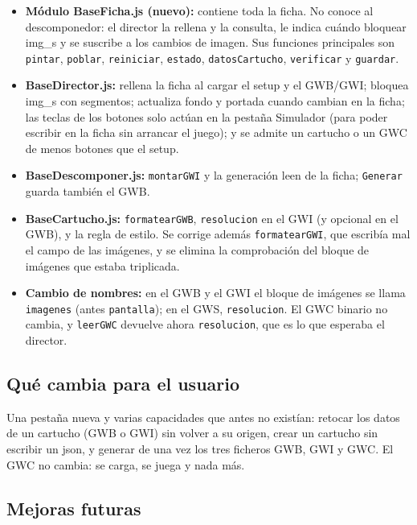 \begin{itemize}
	\item \textbf{Módulo BaseFicha.js (nuevo):} contiene toda la ficha. No conoce al descomponedor: el director la rellena y la consulta, le indica cuándo bloquear img\_s y se suscribe a los cambios de imagen. Sus funciones principales son \texttt{pintar}, \texttt{poblar}, \texttt{reiniciar}, \texttt{estado}, \texttt{datosCartucho}, \texttt{verificar} y \texttt{guardar}.
	\item \textbf{BaseDirector.js:} rellena la ficha al cargar el setup y el GWB/GWI; bloquea img\_s con segmentos; actualiza fondo y portada cuando cambian en la ficha; las teclas de los botones solo actúan en la pestaña Simulador (para poder escribir en la ficha sin arrancar el juego); y se admite un cartucho o un GWC de menos botones que el setup.
	\item \textbf{BaseDescomponer.js:} \texttt{montarGWI} y la generación leen de la ficha; \texttt{Generar} guarda también el GWB.
	\item \textbf{BaseCartucho.js:} \texttt{formatearGWB}, \texttt{resolucion} en el GWI (y opcional en el GWB), y la regla de estilo. Se corrige además \texttt{formatearGWI}, que escribía mal el campo de las imágenes, y se elimina la comprobación del bloque de imágenes que estaba triplicada.
	\item \textbf{Cambio de nombres:} en el GWB y el GWI el bloque de imágenes se llama \texttt{imagenes} (antes \texttt{pantalla}); en el GWS, \texttt{resolucion}. El GWC binario no cambia, y \texttt{leerGWC} devuelve ahora \texttt{resolucion}, que es lo que esperaba el director.
\end{itemize}

\subsection{Qué cambia para el usuario}
\label{sec:F5I10Usuario}

Una pestaña nueva y varias capacidades que antes no existían: retocar
los datos de un cartucho (GWB o GWI) sin volver a su origen, crear
un cartucho sin escribir un json, y generar de una vez los tres ficheros 
GWB, GWI y GWC. El GWC no cambia: se carga, se juega y nada más.

\subsection{Mejoras futuras}
\label{sec:F5I10Mejoras}


